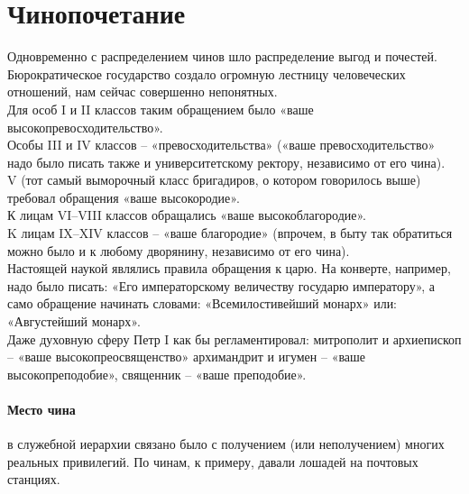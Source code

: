 \documentclass[12pt,a4paper]{article}
\begin{document}
\section{Чинопочетание}
Одновременно с распределением чинов шло
распределение выгод и почестей. Бюрократическое
государство создало огромную лестницу человеческих отношений, нам сейчас совершенно непонятных.\\
Для особ I и II классов таким обращением было
«ваше высокопревосходительство».\\ 
Особы III и IV классов –
«превосходительства» («ваше превосходительство» надо
было писать также и университетскому ректору, независимо
от его чина).\\ V (тот самый выморочный класс бригадиров,
о котором говорилось выше) требовал обращения «ваше
высокородие».\\ К лицам VI–VIII классов обращались «ваше
высокоблагородие».\\ K лицам IX–XIV классов – «ваше
благородие» (впрочем, в быту так обратиться можно было
и к любому дворянину, независимо от его чина).\\
Настоящей наукой являлись правила обращения к царю. На конверте,
например, надо было писать: «Его императорскому
величеству государю императору», а само обращение
начинать словами: «Всемилостивейший монарх» или:
«Августейший монарх».\\ Даже духовную сферу Петр I как бы
регламентировал: митрополит и архиепископ – «ваше
высокопреосвященство» архимандрит и игумен – «ваше высокопреподобие», священник – «ваше преподобие».

\paragraph*{Место чина}
  в служебной иерархии связано было
с получением (или неполучением) многих реальных
привилегий. 
По чинам, к примеру, давали лошадей на
почтовых станциях.
\end{document}

